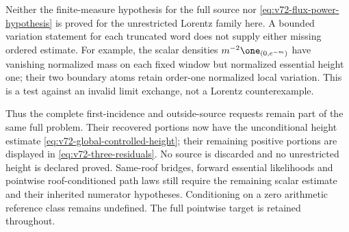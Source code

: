 Neither the finite-measure hypothesis for the full source nor
\eqref{eq:v72-flux-power-hypothesis} is proved for the unrestricted
Lorentz family here. A bounded variation statement for each truncated
word does not supply either missing ordered estimate. For example,
the scalar densities
$m^{-2}\one_{(0,e^{-m})}$ have vanishing normalized mass on each
fixed window but normalized essential height one; their two boundary
atoms retain order-one normalized local variation. This is a test
against an invalid limit exchange, not a Lorentz counterexample.

Thus the complete first-incidence and outside-source requests remain
part of the same full problem. Their recovered portions now have the
unconditional height estimate \eqref{eq:v72-global-controlled-height};
their remaining positive portions are displayed in
\eqref{eq:v72-three-residuals}. No source is discarded and no
unrestricted height is declared proved. Same-roof bridges, forward
essential likelihoods and pointwise roof-conditioned path laws still
require the remaining scalar estimate and their inherited numerator
hypotheses. Conditioning on a zero arithmetic reference class remains
undefined. The full pointwise target is retained throughout.
\label{end:v72-new-mathematics}
